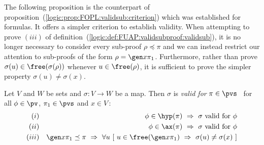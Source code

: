The following proposition is the counterpart of
proposition~(\ref{logic:prop:FOPL:validsub:criterion}) which was
established for formulas. It offers a simpler criterion to establish
validity. When attempting to prove $(iii)$ of
definition~(\ref{logic:def:FUAP:validsubproof:validsub}), it is no
longer necessary to consider every sub-proof $\rho\preceq\pi$ and we
can instead restrict our attention to sub-proofs of the form
$\rho=\gen x\pi_{1}$. Furthermore, rather than prove
$\sigma(u)\in\free(\sigma(\rho))$ whenever $u\in\free(\rho)$, it is
sufficient to prove the simpler property $\sigma(u)\neq\sigma(x)$.

\begin{prop}\label{logic:prop:FUAP:validsubproof:criterion}
Let $V$ and $W$ be sets and $\sigma:V\to W$ be a map. Then $\sigma$
is {\em valid for} $\pi\in\pvs$ \ifand\ for all $\phi\in\pv$,
$\pi_{1}\in\pvs$ and $x\in V$\,:
    \begin{eqnarray*}
    (i)&&\phi\in\hyp(\pi)\ \Rightarrow\ \mbox{$\sigma$ valid for $\phi$}\\
    (ii)&&\phi\in\ax(\pi)\ \Rightarrow\ \mbox{$\sigma$ valid for $\phi$}\\
    (iii)&&\gen x\pi_{1}\preceq\pi\ \Rightarrow\ \forall u\ [\ u\in\free(\gen x\pi_{1})\
    \Rightarrow\ \sigma(u)\neq\sigma(x)\ ]
    \end{eqnarray*}
\end{prop}
